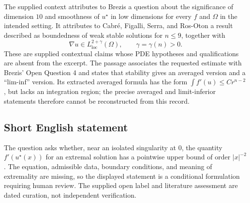 \documentclass[11pt]{article}
\begin{document}
The supplied context attributes to Brezis a question about the significance of dimension \(10\) and smoothness of \(u^\star\) in low dimensions for every \(f\) and \(\Omega\) in the intended setting. It attributes to Cabr\'e, Figalli, Serra, and Ros-Oton a result described as boundedness of weak stable solutions for \(n\leq 9\), together with
\[
\nabla u\in L^{2+\gamma}_{\mathrm{loc}}(\Omega),\qquad \gamma=\gamma(n)>0.
\]
These are supplied contextual claims whose PDE hypotheses and qualifications are absent from the excerpt. The passage associates the requested estimate with Brezis' Open Question 4 and states that stability gives an averaged version and a ``lim-inf'' version. Its extracted averaged formula has the form \(\int f'(u)\leq Cr^{n-2}\), but lacks an integration region; the precise averaged and limit-inferior statements therefore cannot be reconstructed from this record.
\subsection{Short English statement}
The question asks whether, near an isolated singularity at \(0\), the quantity \(f'(u^\star(x))\) for an extremal solution has a pointwise upper bound of order \(|x|^{-2}\). The equation, admissible data, boundary conditions, and meaning of extremality are missing, so the displayed statement is a conditional formulation requiring human review. The supplied open label and literature assessment are dated curation, not independent verification.
\end{document}
